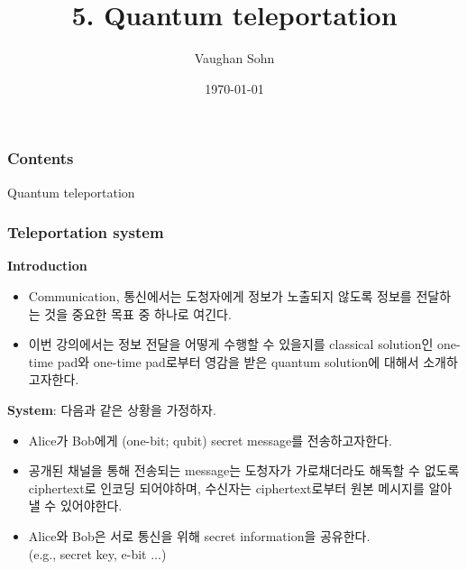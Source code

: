 \documentclass[9pt]{beamer}
\title{5. Quantum teleportation}
\date{\today}
\author{Vaughan Sohn}
\begin{document}
    \maketitle
    
    \begin{frame}
        \frametitle{Contents}
        \tableofcontents
    \end{frame}

    \begin{section}{Quantum teleportation}
        \begin{frame}
            \frametitle{Teleportation system}
            \textbf{Introduction}
            \begin{itemize}
                \item Communication, 통신에서는 도청자에게 정보가 노출되지 않도록 정보를 전달하는 것을 중요한 목표 중 하나로 여긴다.
                \item 이번 강의에서는 정보 전달을 어떻게 수행할 수 있을지를 classical solution인 \alert{one-time pad}와 one-time pad로부터 영감을 받은 quantum solution에 대해서 소개하고자한다. 
            \end{itemize}
            \vspace{0.4cm}
            \textbf{System}: 다음과 같은 상황을 가정하자.
            \begin{itemize}
                \item Alice가 Bob에게 (one-bit; qubit) secret message를 전송하고자한다.
                \item 공개된 채널을 통해 전송되는 message는 도청자가 가로채더라도 해독할 수 없도록 ciphertext로 인코딩 되어야하며, 수신자는 ciphertext로부터 원본 메시지를 알아낼 수 있어야한다.
                \item Alice와 Bob은 서로 통신을 위해 secret information을 공유한다. \\(e.g., secret key, e-bit ...)
            \end{itemize}
        \end{frame}


\end{section}
\end{document}
